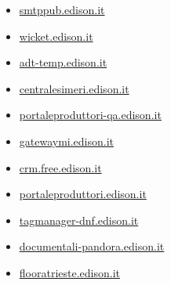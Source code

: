 \documentclass{article}
\begin{document}
\begin{itemize}
    
        
        
        \item \href{ http://smtppub.edison.it/ }{ smtppub.edison.it }
    
        
        
        \item \href{ http://wicket.edison.it/ }{ wicket.edison.it }
    
        
        
        \item \href{ http://adt-temp.edison.it/ }{ adt-temp.edison.it }
    
        
        
        \item \href{ https://centralesimeri.edison.it/ }{ centralesimeri.edison.it }
    
        
        
        \item \href{ https://portaleproduttori-qa.edison.it/ }{ portaleproduttori-qa.edison.it }
    
        
        
        \item \href{ https://gatewaymi.edison.it/logon/LogonPoint/index.html }{ gatewaymi.edison.it }
    
        
        
        \item \href{ http://crm.free.edison.it/ }{ crm.free.edison.it }
    
        
        
        \item \href{ http://portaleproduttori.edison.it/ }{ portaleproduttori.edison.it }
    
        
        
        \item \href{ http://tagmanager-dnf.edison.it/ }{ tagmanager-dnf.edison.it }
    
        
        
        \item \href{ http://documentali-pandora.edison.it/ }{ documentali-pandora.edison.it }
    
        
        
        \item \href{ http://flooratrieste.edison.it/ }{ flooratrieste.edison.it }
    
        
        

\end{itemize}
\end{document}
